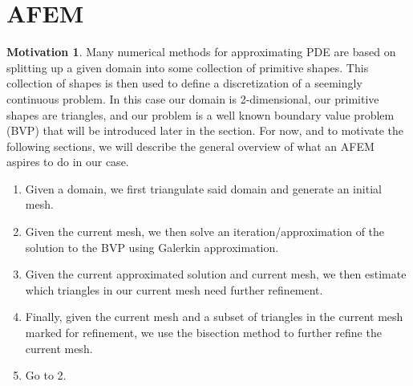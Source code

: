 \documentclass[11pt]{article}
\theoremstyle{definition}
\newtheorem*{motivation}{Motivation}
\begin{document}
\section{AFEM}
\begin{motivation}
	Many numerical methods for approximating PDE are based on splitting up a given domain into some collection of primitive shapes.
	This collection of shapes is then used to define a discretization of a seemingly continuous problem.
	In this case our domain is 2-dimensional, our primitive shapes are triangles, and our problem is a well known boundary value problem (BVP)
	that will be introduced later in the section. For now, and to motivate the following sections, we will describe the general overview
	of what an AFEM aspires to do in our case.
	\begin{enumerate}[1.]
		\item Given a domain, we first triangulate said domain and generate an initial mesh.
		\item Given the current mesh, we then solve an iteration/approximation of the solution to the BVP using Galerkin approximation.
		\item Given the current approximated solution and current mesh, we then estimate which triangles in our current mesh need further refinement.
		\item Finally, given the current mesh and a subset of triangles in the current mesh marked for refinement, we use the bisection method to further refine the current mesh.
		\item Go to 2.
	\end{enumerate}
\end{motivation}

\newpage
\end{document}
